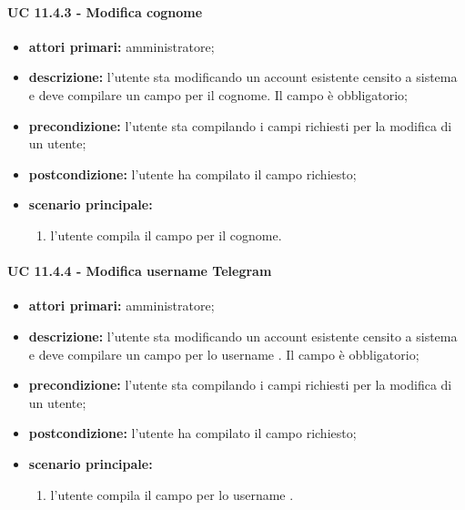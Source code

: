 				\paragraph{UC 11.4.3 - Modifica cognome}
				\begin{itemize}
					\item \textbf{attori primari:} amministratore;
					\item \textbf{descrizione:} l'utente sta modificando un account esistente censito a sistema e deve compilare un campo per il cognome. Il campo è obbligatorio;
					\item \textbf{precondizione:} l'utente sta compilando i campi richiesti per la modifica di un utente;
					\item \textbf{postcondizione:} l'utente ha compilato il campo richiesto;
					\item \textbf{scenario principale:}
					\begin{enumerate}
						\item{l'utente compila il campo per il cognome.}
					\end{enumerate}
				\end{itemize}

				\paragraph{UC 11.4.4 - Modifica username Telegram}
				\begin{itemize}
					\item \textbf{attori primari:} amministratore;
					\item \textbf{descrizione:} l'utente sta modificando un account esistente censito a sistema e deve compilare un campo per lo username . Il campo è obbligatorio;
					\item \textbf{precondizione:} l'utente sta compilando i campi richiesti per la modifica di un utente;
					\item \textbf{postcondizione:} l'utente ha compilato il campo richiesto;
					\item \textbf{scenario principale:}
					\begin{enumerate}
						\item{l'utente compila il campo per lo username .}
					\end{enumerate}
				\end{itemize}


